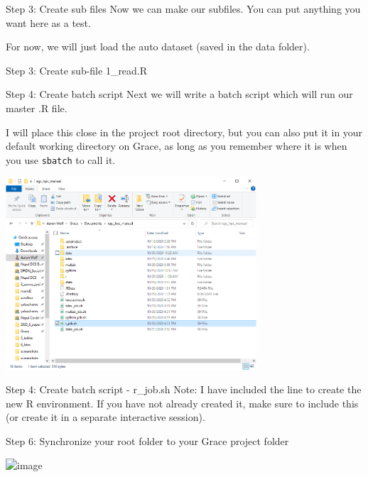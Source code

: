 \documentclass[10pt,xcolor={svgnames}]{beamer}
\begin{document}
\begin{frame}{Step 3: Create sub files}
Now we can make our subfiles. You can put anything you want here as a test. 

For now, we will just load the auto dataset (saved in the data folder).
\end{frame}

\begin{frame}[fragile]{Step 3: Create sub-file 1\_read.R}
\center
{}
\end{frame}

\begin{frame}{Step 4: Create batch script} 
\center
Next we will write a batch script which will run our master .R file.

I will place this close in the project root directory, but you can also put it in your default working directory on Grace, as long as you remember where it is when you use \texttt{sbatch} to call it.

\includegraphics[width=0.7\textwidth]{screenshots/fig14c.PNG} 

\end{frame}


\begin{frame}[fragile]{Step 4: Create batch script - r\_job.sh}
Note: I have included the line to create the new R environment. If you have not already created it, make sure to include this (or create it in a separate interactive session).
\center

\end{frame}

\begin{frame}{Step 6: Synchronize your root folder to your Grace project folder}
\center
{}

\includegraphics<1>[width=0.9\textwidth]{screenshots/fig11a.PNG}
\end{frame}
\end{document}

